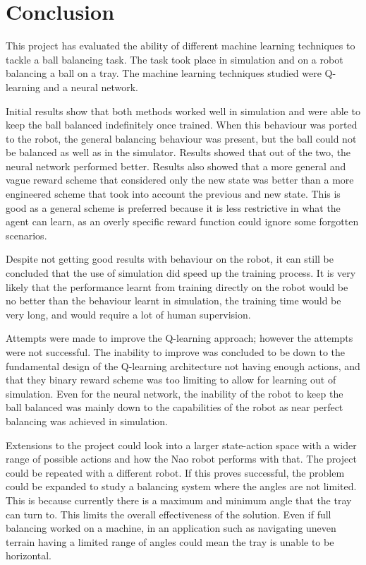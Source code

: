\documentclass[12pt,a4paper]{article}
\begin{document}
\section{Conclusion}

This project has evaluated the ability of different machine learning techniques to tackle a ball balancing task. The task took place in simulation and on a robot balancing a ball on a tray. The machine learning techniques studied were Q-learning and a neural network. 

Initial results show that both methods worked well in simulation and were able to keep the ball balanced indefinitely once trained. When this behaviour was ported to the robot, the general balancing behaviour was present, but the ball could not be balanced as well as in the simulator. Results showed that out of the two, the neural network performed better. Results also showed that a more general and vague reward scheme that considered only the new state was better than a more engineered scheme that took into account the previous and new state. This is good as a general scheme is preferred because it is less restrictive in what the agent can learn, as an overly specific reward function could ignore some forgotten scenarios.

Despite not getting good results with behaviour on the robot, it can still be concluded that the use of simulation did speed up the training process. It is very likely that the performance learnt from training directly on the robot would be no better than the behaviour learnt in simulation, the training time would be very long, and would require a lot of human supervision.

Attempts were made to improve the Q-learning approach; however the attempts were not successful. The inability to improve was concluded to be down to the fundamental design of the Q-learning architecture not having enough actions, and that they binary reward scheme was too limiting to allow for learning out of simulation. Even for the neural network, the inability of the robot to keep the ball balanced was mainly down to the capabilities of the robot as near perfect balancing was achieved in simulation. 

Extensions to the project could look into a larger state-action space with a wider range of possible actions and how the Nao robot performs with that. The project could be repeated with a different robot. If this proves successful, the problem could be expanded to study a balancing system where the angles are not limited. This is because currently there is a maximum and minimum angle that the tray can turn to. This limits the overall effectiveness of the solution. Even if full balancing worked on a machine, in an application such as navigating uneven terrain having a limited range of angles could mean the tray is unable to be horizontal.


\end{document}

